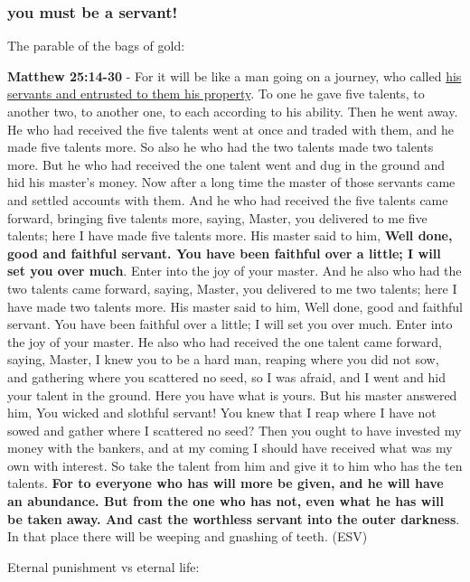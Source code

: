 \documentclass[11pt]{article}
\begin{document}
\subsubsection{you must be a servant!}
\label{sec:org161c942}
The parable of the bags of gold:

\textbf{Matthew 25:14-30} - For it will be like a man going on a journey, who called \uline{his servants and entrusted to them his property}. To one he gave five talents, to another two, to another one, to each according to his ability. Then he went away. He who had received the five talents went at once and traded with them, and he made five talents more. So also he who had the two talents made two talents more. But he who had received the one talent went and dug in the ground and hid his master's money. Now after a long time the master of those servants came and settled accounts with them. And he who had received the five talents came forward, bringing five talents more, saying, Master, you delivered to me five talents; here I have made five talents more. His master said to him, \textbf{Well done, good and faithful servant. You have been faithful over a little; I will set you over much}. Enter into the joy of your master. And he also who had the two talents came forward, saying, Master, you delivered to me two talents; here I have made two talents more. His master said to him, Well done, good and faithful servant. You have been faithful over a little; I will set you over much. Enter into the joy of your master. He also who had received the one talent came forward, saying, Master, I knew you to be a hard man, reaping where you did not sow, and gathering where you scattered no seed, so I was afraid, and I went and hid your talent in the ground. Here you have what is yours. But his master answered him, You wicked and slothful servant! You knew that I reap where I have not sowed and gather where I scattered no seed? Then you ought to have invested my money with the bankers, and at my coming I should have received what was my own with interest. So take the talent from him and give it to him who has the ten talents. \textbf{For to everyone who has will more be given, and he will have an abundance. But from the one who has not, even what he has will be taken away. And cast the worthless servant into the outer darkness}. In that place there will be weeping and gnashing of teeth. (ESV)

Eternal punishment vs eternal life:
\end{document}
